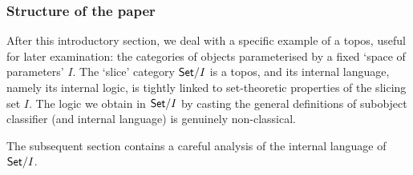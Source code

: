 \subsubsection{Structure of the paper}


After this introductory section, we deal with a specific example of a topos, useful for later examination: the categories of objects parameterised by a fixed `space of parameters' $I$. The `slice' category $\mathsf{Set}/I$ is a topos, and its internal language, namely its internal logic, is tightly linked to set-theoretic properties of the slicing set $I$. The logic we obtain in $\mathsf{Set}/I$ by casting the general definitions of subobject classifier (and internal language) is genuinely non-classical.

The subsequent section contains a careful analysis of the internal language of $\mathsf{Set}/I$.

